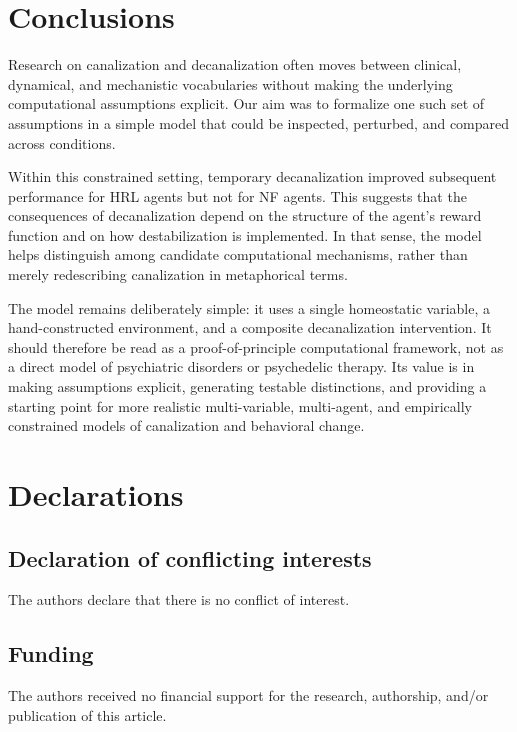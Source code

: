 \documentclass[12pt,fleqn]{article}
\begin{document}
\section{Conclusions}

Research on canalization and decanalization often moves between clinical, dynamical, and mechanistic vocabularies without making the underlying computational assumptions explicit. Our aim was to formalize one such set of assumptions in a simple model that could be inspected, perturbed, and compared across conditions.

Within this constrained setting, temporary decanalization improved subsequent performance for HRL agents but not for NF agents. This suggests that the consequences of decanalization depend on the structure of the agent's reward function and on how destabilization is implemented. In that sense, the model helps distinguish among candidate computational mechanisms, rather than merely redescribing canalization in metaphorical terms.

The model remains deliberately simple: it uses a single homeostatic variable, a hand-constructed environment, and a composite decanalization intervention. It should therefore be read as a proof-of-principle computational framework, not as a direct model of psychiatric disorders or psychedelic therapy. Its value is in making assumptions explicit, generating testable distinctions, and providing a starting point for more realistic multi-variable, multi-agent, and empirically constrained models of canalization and behavioral change.

\section*{Declarations}

\subsection*{Declaration of conflicting interests}
The authors declare that there is no conflict of interest.

\subsection*{Funding}
\begin{sloppypar}
  The authors received no financial support for the research, authorship, and/or publication of this article.
\end{sloppypar}
\end{document}
